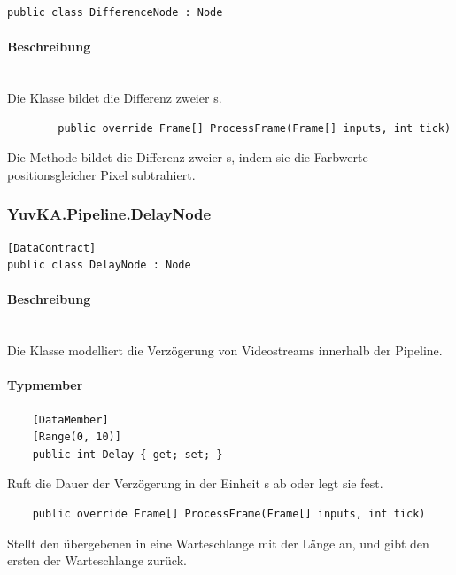\begin{verbatim}
public class DifferenceNode : Node
\end{verbatim}

\paragraph{Beschreibung}~\\
Die Klasse  bildet die Differenz zweier s.

\begin{itemize}
	\begin{verbatim}
		public override Frame[] ProcessFrame(Frame[] inputs, int tick)
	\end{verbatim}
Die Methode  bildet die Differenz zweier s, indem sie die Farbwerte positionsgleicher Pixel subtrahiert.

\end{itemize}

\subsubsection{YuvKA.Pipeline.DelayNode}

\begin{verbatim}
[DataContract]
public class DelayNode : Node
\end{verbatim}

\paragraph{Beschreibung}~\\
Die Klasse  modelliert die Verzögerung von Videostreams innerhalb der Pipeline.

\paragraph{Typmember}
\begin{itemize}
	
	\begin{verbatim}
	[DataMember]
	[Range(0, 10)]
	public int Delay { get; set; }
	\end{verbatim}
	Ruft die Dauer der Verzögerung in der Einheit s ab oder legt sie fest.

	\begin{verbatim}
	public override Frame[] ProcessFrame(Frame[] inputs, int tick)
	\end{verbatim}
	Stellt den übergebenen  in eine Warteschlange mit der Länge  an, und gibt den ersten  der Warteschlange zurück.
	
\end{itemize}

